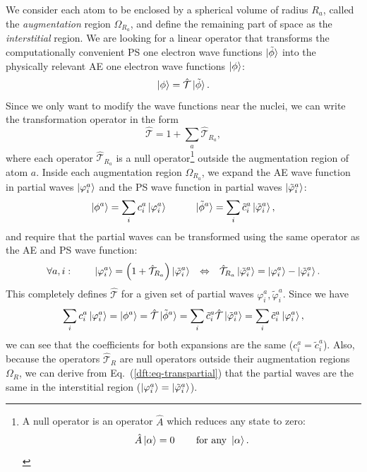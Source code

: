 \begin{refsection}
We consider each atom to be enclosed by a spherical volume of radius $R_a$, 
called the \textit{augmentation} region $\Omega_{R_a}$, and define the 
remaining part of space as the \textit{interstitial} region. We are looking 
for a linear operator that transforms the computationally convenient PS one 
electron wave functions $\ket{\tilde{\phi}}$ into the physically relevant AE 
one electron wave functions $\ket{\phi}$: 
\begin{equation}\label{dft:eq-PAW} 
\ket{\phi} = \hat{\mathcal{T}} \ket{\tilde{\phi}}. 
\end{equation} 
Since we only want to modify the wave functions near the nuclei, we can write 
the transformation operator in the form 
\begin{equation} 
\hat{\mathcal{T}} = 1 + \sum_a \hat{\mathcal{T}}_{R_a}, 
\end{equation} 
where each operator $\hat{\mathcal{T}}_{R_a}$ is a null operator\footnote{A 
null operator is an operator $\hat{A}$ which reduces any state to 
zero:\begin{equation*}\hat{A}\ket{\alpha}=0\hspace{0.3in}\text{for any } 
\ket{\alpha}.\end{equation*}} outside the augmentation region of atom $a$. 
Inside each augmentation region $\Omega_{R_a}$, we expand the AE wave function 
in partial waves $\ket{\varphi_i^a}$ and the PS wave function in partial waves 
$\ket{\tilde{\varphi}_i^a}$: 
\begin{equation} 
\ket{\phi^a} = \sum_i c_i^a \ket{\varphi_i^a} \hspace{0.4in} 
\ket{\tilde{\phi}^a} = \sum_i \tilde{c}_i^a \ket{\tilde{\varphi}_i^a}, 
\end{equation} 
and require that the partial waves can be transformed using the same operator 
as the AE and PS wave function: 
\begin{equation}\label{dft:eq-transpartial} 
\forall a,i:\hspace{0.3in}\ket{\varphi_i^a} = \left( 1 + 
\hat{\mathcal{T}}_{R_a} \right) \ket{\tilde{\varphi}_i^a} \hspace{0.1in} 
\Leftrightarrow \hspace{0.1in} \hat{\mathcal{T}}_{R_a} 
\ket{\tilde{\varphi}_i^a} = \ket{\varphi_i^a} - \ket{\tilde{\varphi}_i^a}. 
\end{equation} 
This completely defines $\hat{\mathcal{T}}$ for a given set of partial waves 
$\varphi_i^a,\tilde{\varphi}_i^a$. Since we have 
\begin{equation} 
\sum_i c_i^a \ket{\varphi_i^a} = \ket{\phi^a} = \hat{\mathcal{T}} 
\ket{\tilde{\phi}^a} = \sum_i \tilde{c}_i^a \hat{\mathcal{T}} 
\ket{\tilde{\varphi}_i^a} = \sum_i \tilde{c}_i^a \ket{\varphi_i^a}, 
\end{equation} 
we can see that the coefficients for both expansions are the same ($c_i^a = 
\tilde{c}_i^a$). Also, because the operators $\hat{\mathcal{T}}_R$ are null 
operators outside their augmentation regions $\Omega_R$, we can derive from 
Eq.~(\ref{dft:eq-transpartial}) that the partial waves are the same in the 
interstitial region ($\ket{\varphi_i^a} = \ket{\tilde{\varphi}_i^a}$). 
 

\end{refsection}
